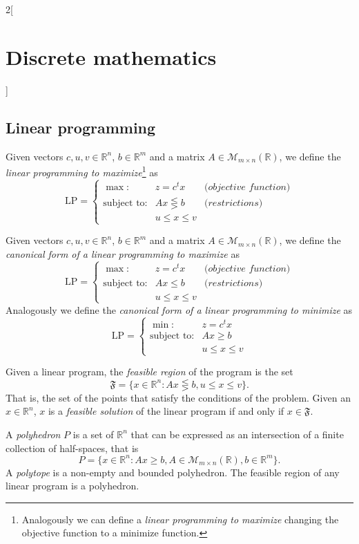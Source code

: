 \documentclass[class=article,10pt,crop=false]{standalone}
\begin{document}
\begin{multicols}{2}[\section{Discrete mathematics}]
\subsection{Linear programming}
\begin{definition}
Given vectors $c,u,v\in\mathbb{R}^n$, $b\in\mathbb{R}^m$ and a matrix $A\in\mathcal{M}_{m\times n}(\mathbb{R})$, we define the \textit{linear programming to maximize}\footnote{Analogously we can define a \textit{linear programming to maximize} changing the objective function to a minimize function.} as $$\text{LP}=\left\{\begin{array}{rcl}
    \max: & z=c^tx & \textit{(objective function)} \\
    \text{subject to}: & Ax\lesseqgtr b & \textit{(restrictions)}\\
     & u\leq x\leq v & 
    \end{array}\right.$$
\end{definition}
\begin{definition}
Given vectors $c,u,v\in\mathbb{R}^n$, $b\in\mathbb{R}^m$ and a matrix $A\in\mathcal{M}_{m\times n}(\mathbb{R})$, we define the \textit{canonical form of a linear programming to maximize} as $$\text{LP}=\left\{\begin{array}{rcl}
    \max: & z=c^tx & \textit{(objective function)} \\
    \text{subject to}: & Ax\leq b & \textit{(restrictions)}\\
     & u\leq x\leq v & 
    \end{array}\right.$$
Analogously we define the \textit{canonical form of a linear programming to minimize} as $$\text{LP}=\left\{\begin{array}{rc}
    \min: & z=c^tx \\
    \text{subject to}: & Ax\geq b\\
     & u\leq x\leq v
    \end{array}\right.$$
\end{definition}
\begin{definition}
Given a linear program, the \textit{feasible region} of the program is the set $$\mathfrak{F}=\{x\in\mathbb{R}^n:Ax\lesseqgtr b,u\leq x\leq v\}.$$ That is, the set of the points that satisfy the conditions of the problem. Given an $x\in\mathbb{R}^n$, $x$ is a \textit{feasible solution} of the linear program if and only if $x\in\mathfrak{F}$.
\end{definition}
\begin{definition}
A \textit{polyhedron} $P$ is a set of $\mathbb{R}^n$ that can be expressed as an intersection of a finite collection of half-spaces, that is $$P=\{x\in\mathbb{R}^n:Ax\geq b, A\in\mathcal{M}_{m\times n}(\mathbb{R}),b\in\mathbb{R}^m\}.$$ A \textit{polytope} is a non-empty and bounded polyhedron. The feasible region of any linear program is a polyhedron.

\end{definition}
\end{multicols}
\end{document}
